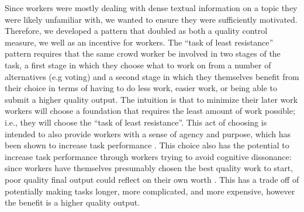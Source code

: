 Since workers were mostly dealing with dense textual information on a topic they were likely unfamiliar with, we wanted to ensure they were sufficiently motivated. Therefore, we developed a pattern that doubled as both a quality control measure, we well as an incentive for workers. The ``task of least resistance'' pattern requires that the same crowd worker be involved in two stages of the task, a first stage in which they choose what to work on from a number of alternatives (e.g voting) and a second stage in which they themselves benefit from their choice in terms of having to do less work, easier work, or being able to submit a higher quality output. The intuition is that to minimize their later work workers will choose a foundation that requires the least amount of work possible; i.e., they will choose the ``task of least resistance''. This act of choosing is intended to also provide workers with a sense of agency and purpose, which has been shown to increase task performance \cite{chandler2013breaking, rogstadius2011assessment}. This choice also has the potential to increase task performance through workers trying to avoid cognitive dissonance: since workers have themselves presumably chosen the best quality work to start, poor quality final output could reflect on their own worth \cite{weick1964reduction}. This has a trade off of potentially making tasks longer, more complicated, and more expensive, however the benefit is a higher quality output. 



